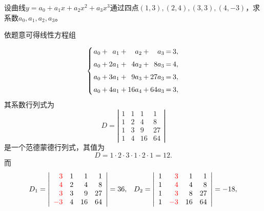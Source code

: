 \begin{li}
  设曲线$y=a_0+a_1x + a_2 x^2 + a_3 x^3$通过四点$(1,3), (2,4), (3,3), (4,-3)$，求系数$a_0,a_1,a_2,a_3$。
\end{li}
\begin{jie}
  依题意可得线性方程组

  $$
  \setlength{\arraycolsep}{1.0pt}
  \left\{
    \begin{array}{rcrcrcrcr}
      a_0 & + &  a_1 & + &  a_2 & + &   a_3 & = & 3, \\[0.2cm]
      a_0 & + & 2a_1 & + & 4a_2 & + &  8a_3 & = & 4, \\[0.2cm]
      a_0 & + & 3a_1 & + & 9a_3 & + & 27a_3 & = & 3, \\[0.2cm]
      a_0 & + & 4a_1 & + &16a_4 & + & 64a_3 & = & 3,
    \end{array}
  \right.
  $$
  其系数行列式为
  $$
  D = \left|
    \begin{array}{rrrr}
      1 & 1 &  1 &  1 \\
      1 & 2 &  4 &  8 \\
      1 & 3 &  9 & 27 \\
      1 & 4 & 16 & 64
    \end{array}
  \right|
  $$
  是一个范德蒙德行列式，其值为
  $$ 
  D = 1\cdot 2 \cdot 3 \cdot 1 \cdot 2 \cdot 1 = 12.
  $$
  而
  $$
  \begin{array}{ll}
    D_1 = \left|
    \begin{array}{rrrr}
      \red{3}  &  1 &  1 &  1\\
      \red{4}  &  2 &  4 &  8\\
      \red{3}  &  3 &  9 & 27\\
      \red{-3} &  4 & 16 & 64
    \end{array}
                           \right|= 36, &
                                          D_2 = \left|
                                          \begin{array}{rrrr}
                                            1 & \red{3}  & 1  &  1\\
                                            1 & \red{4}  & 4  &  8\\
                                            1 & \red{3}  & 8  &  27\\
                                            1 & \red{-3} & 16 &  64
                                          \end{array}
                                                                \right|=-18,\\[0.8cm]

\end{array}$$
\end{jie}
